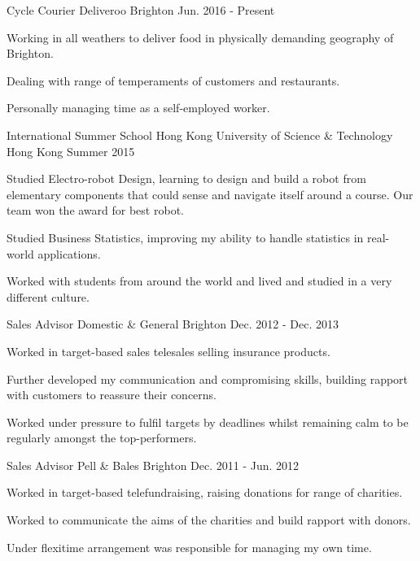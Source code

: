 \begin{cventries}
  \cventry
    {Cycle Courier}
    {Deliveroo}
    {Brighton}
    {Jun. 2016 - Present}
    {
      \begin{cvitems}
        \item {Working in all weathers to deliver food in physically demanding geography of Brighton.}
        \item {Dealing with range of temperaments of customers and restaurants.}
        \item{Personally managing time as a self-employed worker.}
      \end{cvitems}
    }
  \cventry
    {International Summer School}
    {Hong Kong University of Science \& Technology}
    {Hong Kong}
    {Summer 2015}
    {
      \begin{cvitems}
        \item {Studied Electro-robot Design, learning to design and build a robot from elementary components that could sense and navigate itself around a course. Our team won the award for best robot.}
        \item {Studied Business Statistics, improving my ability to handle statistics in real-world applications.}
        \item {Worked with students from around the world and lived and studied in a very different culture.}
      \end{cvitems}
    }
  \cventry
    {Sales Advisor}
    {Domestic \& General}
    {Brighton}
    {Dec. 2012 - Dec. 2013}
    {
      \begin{cvitems}
        \item {Worked in target-based sales telesales selling insurance products.}
        \item{Further developed my communication and compromising skills, building rapport with customers to reassure their concerns.}
        \item {Worked under pressure to fulfil targets by deadlines whilst remaining calm to be regularly amongst the top-performers.}
      \end{cvitems}
    }
  \cventry
    {Sales Advisor}
    {Pell \& Bales}
    {Brighton}
    {Dec. 2011 - Jun. 2012}
    {
      \begin{cvitems}
        \item {Worked in target-based  telefundraising, raising donations for range of charities.}
        \item{Worked to communicate the aims of the charities and build rapport with donors.}
        \item {Under flexitime arrangement was responsible for managing my own time.}
      \end{cvitems}
    }
\end{cventries}
